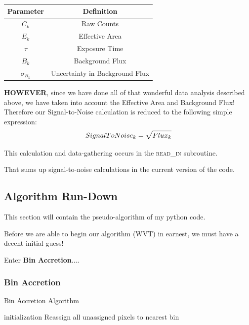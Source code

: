 \documentclass[11pt,letterpaper]{article}
\begin{document}
\begin{center}
	\begin{tabular}{|c|c|}
		\hline 
		Parameter & Definition \\
		\hline
		\hline
		$C_k$ & Raw Counts \\
		\hline 
		$E_k$ & Effective Area \\
		\hline 
		$\tau$ & Exposure Time \\
		\hline
		$B_k$ & Background Flux \\
		\hline 
		$\sigma_{B_k}$ & Uncertainty in Background Flux \\
		\hline
	\end{tabular}
\end{center}

\textbf{HOWEVER}, since we have done all of that wonderful data analysis described above, we have taken into account the Effective Area and Background Flux! Therefore our Signal-to-Noise calculation is reduced to the following simple expression:
\begin{equation}\label{eqn:S-N}
	Signal\-To\-Noise_k = \sqrt{Flux_k}
\end{equation}

This calculation and data-gathering occurs in the \textsc{read\_in} subroutine. 

That sums up signal-to-noise calculations in the current version of the code.

\subsection{Algorithm Run-Down}
This section will contain the pseudo-algorithm of my python code.

Before we are able to begin our algorithm (WVT) in earnest, we must have a decent initial guess! 

Enter \textbf{Bin Accretion}....
\subsubsection{Bin Accretion}
\begin{algorithm}[H]\label{algo:BA}
	\caption{Bin Accretion Algorithm}
	initialization\;
	Reassign all unassigned pixels to nearest bin\;
\end{algorithm}
\end{document}

